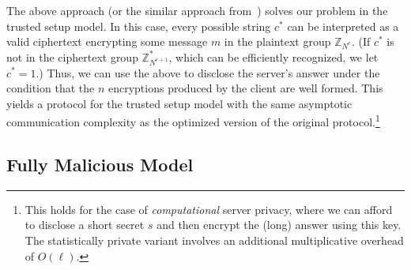\documentclass[11pt]{article}
\newcommand{\Z}{\mathbb{Z}}
\begin{document}
The above approach (or the similar approach from~\cite{L05}) solves
our problem in the trusted setup model. In this case, every
possible string $c^*$ can be interpreted as a valid ciphertext
encrypting some message $m$ in the plaintext group $\Z_{N^e}$.
(If $c^*$ is not in the ciphertext group $\Z^*_{N^{e+1}}$, which
can be efficiently recognized, we let $c^*=1$.) Thus, we can use
the above to disclose the server's answer under the condition that
the $n$ encryptions produced by the client are well formed. This
yields a protocol for the trusted setup model
with the same asymptotic communication complexity as the optimized
version of the original protocol.\footnote{This holds for the case
of {\em computational} server privacy, where we can afford to
disclose a short secret $s$ and then encrypt the (long) answer
using this key. The statistically private variant involves an
additional multiplicative overhead of $O(\ell)$. }

\subsection{Fully Malicious Model}
\label{sec-fullmalicious}
\end{document}
